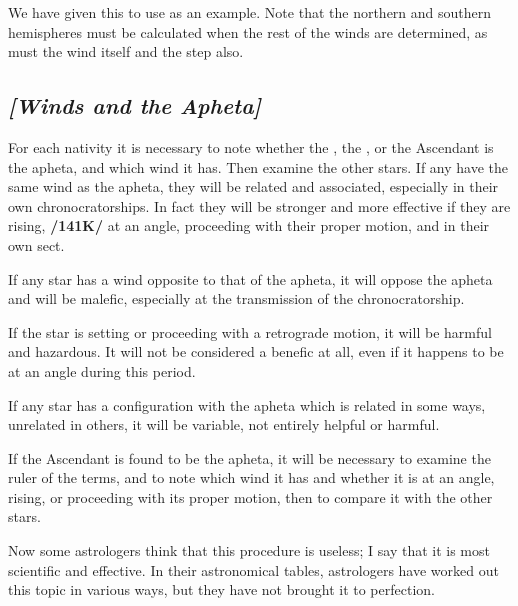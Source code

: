 We have given this to use as an example. Note that the northern and southern hemispheres must be calculated when the rest of the winds are determined, as must the wind itself and the step also.

\subsection{\textit{[Winds and the Apheta]}}
For each nativity it is necessary to note whether the \Sun, the \Moon, or the Ascendant is the apheta, and which wind it has. Then examine the other stars. If any have the same wind as the apheta, they will be related and associated, especially in their own chronocratorships. \mndl In fact they will be stronger and more effective if they are rising, \textbf{/141K/} at an angle, proceeding with their proper motion, and in their own sect.

If any star has a wind opposite to that of the apheta, it will oppose the apheta and will be malefic, especially at the transmission of the chronocratorship. 

If the star is setting or proceeding with a retrograde
motion, it will be harmful and hazardous. It will not be considered a benefic at all, even if it happens to be
at an angle during this period. 

If any star has a configuration with the apheta which is related in some ways, unrelated in others, it will be variable, not entirely helpful or harmful. 

If the Ascendant is found to be the apheta, it will be necessary to examine the ruler of the terms, and to note which wind it has and whether it is at an angle, rising, or proceeding with its proper motion, then to compare it with the other stars.

Now some astrologers think that this procedure is useless; I say that it is most scientific and effective. In their astronomical tables, astrologers have worked out this topic in various ways, but they have not brought it to perfection.

\newpage
